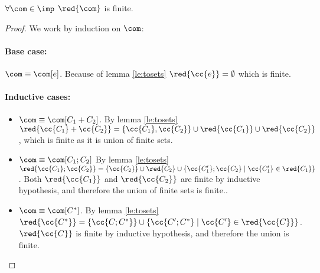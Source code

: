 \begin{lemma}\label{le:reductionsfinite}
  \(\forall \com \in \imp\) \(\red{\com}\) is finite.
\end{lemma}

\begin{proof}
  We work by induction on \(\com\):

  \noindent
  \paragraph*{Base case:\\}
  
  \(\com \equiv \com[e]\). Because of lemma \ref{le:tosets}
  \(\red{\cc{e}} = \emptyset\) which is finite.

  \noindent
  \paragraph*{Inductive cases:\\}
  \begin{itemize}
  \item \(\com \equiv \com[C_1 + C_2]\). By lemma \ref{le:tosets}
    \(\red{\cc{C_1} + \cc{C_2}} = \{\cc{C_1}, \cc{C_2}\} \cup
    \red{\cc{C_1}} \cup \red{\cc{C_2}}\), which is finite as it is
    union of finite sets.
  \item \(\com \equiv \com[C_1;C_2]\) By lemma \ref{le:tosets}
    \(\red{\cc{C_1}; \cc{C_2}} =
    \{\cc{C_2}\}\cup\red{C_2}\cup\{\cc{C_1'};\cc{C_2} \mid
    \cc{C_1'}\in\red{C_1}\}\). Both \(\red{\cc{C_1}}\) and
    \(\red{\cc{C_2}}\) are finite by inductive hypothesis, and
    therefore the union of finite sets is finite..
  \item \(\com \equiv \com[C^*]\). By lemma \ref{le:tosets}
    \(\red{\cc{C^*}} = \{\cc{C;C^*}\} \cup \{\cc{C';C^*} \mid
    \cc{C'}\in\red{\cc{C}}\}\). \(\red{\cc{C}}\) is finite by
    inductive hypothesis, and therefore the union is finite.
  \end{itemize}
  
\end{proof}

